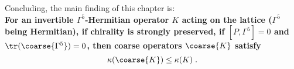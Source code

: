 Concluding, the main finding of this chapter is:\\
\textbf{
For an invertible $\Gamma^{5}$-Hermitian operator $K$ acting on the lattice ($\Gamma^{5}$ being Hermitian),
if chirality is strongly preserved, \ie if $[P, \Gamma^{5}] = 0$ and $\tr(\coarse{\Gamma^5}) = 0$, then coarse operators $\coarse{K}$ satisfy
\begin{equation}
\kappa(\coarse{K}) \leq \kappa(K) \;.
\end{equation}
}
